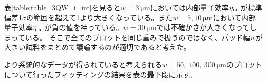 {表\ref{table:table_3QW_i_int}を見ると$w=3\ \si{\micro\metre}$においては内部量子効率$\eta_{\rm{int}}$が標準偏差1$\sigma$の範囲を超えて1より大きくなっている。また$w=5, 10\ \si{\micro\metre}$において内部量子効率$\eta_{\rm{int}}$が負の値を持っている。$w=30\  \si{\micro\metre}$では不確かさが大きくなってしまっている。
そこで全てのプロットを同じ重みで扱うのではなく、パッド幅$w$が大きい試料をまとめて議論するのが適切であると考えた。

より系統的なデータが得られていると考えられる$w=50,\ 100,\ 300\ \si{\micro\metre}$のプロットについて行ったフィッティングの結果を表の最下段に示す。


}
